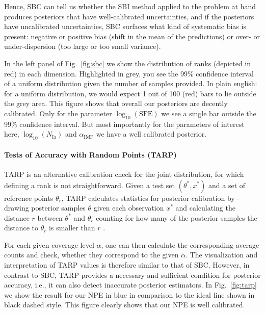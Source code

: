 \documentclass{aa}
\begin{document}
\begin{appendix}
Hence, SBC can tell us whether the SBI method applied to the problem at hand produces posteriors that have well-calibrated uncertainties, and if the posteriors have uncalibrated uncertainties, SBC surfaces what kind of systematic bias is present: negative or positive bias (shift in the mean of the predictions) or over- or under-dispersion (too large or too small variance).

In the left panel of Fig.~\ref{fig:sbc} we show the distribution of ranks (depicted in red) in each dimension. Highlighted in grey, you see the 99\% confidence interval of a uniform distribution given the number of samples provided. In plain english: for a uniform distribution, we would expect 1 out of 100 (red) bars to lie outside the grey area. This figure shows that overall our posteriors are decently calibrated. Only for the parameter $\log_{10}\left(\mathrm{SFE}\right)$ we see a single bar outside the 99\% confidence interval. But most importantly for the parameters of interest here, $\log_{10}\left(N_\mathrm{Ia}\right)$ and $\alpha_\mathrm{IMF}$ we have a well calibrated posterior.

\paragraph{Tests of Accuracy with Random Points (TARP)}

TARP \citep{Lemos2023} is an alternative calibration check for the joint distribution, for which defining a rank is not straightforward. Given a test set $(\theta^*,x^*)$ and a set of reference points $\theta_r$, TARP calculates statistics for posterior calibration by - drawing posterior samples $\theta$ given each observation $x^*$ and calculating the distance $r$ between $\theta^*$ and $\theta_r$ counting for how many of the posterior samples the distance to $\theta_r$ is smaller than $r$ \citep[see e.g. Fig.~2 in][for an illustration]{Lemos2023}.

For each given coverage level $\alpha$, one can then calculate the corresponding average counts and check, whether they correspond to the given $\alpha$. The visualization and interpretation of TARP values is therefore similar to that of SBC. However, in contrast to SBC, TARP provides a necessary and sufficient condition for posterior accuracy, i.e., it can also detect inaccurate posterior estimators. In Fig.~\ref{fig:tarp} we show the result for our NPE in blue in comparison to the ideal line shown in black dashed style. This figure clearly shows that our NPE is well calibrated.


\end{appendix}
\end{document}
